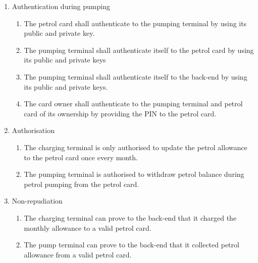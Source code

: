 \begin{enumerate}
\item Authentication during pumping
	\begin{enumerate}
	\item The petrol card shall authenticate to the pumping terminal by using its public and private key. %
	\item The pumping terminal shall authenticate itself to the petrol card by using its public and private keys
	\item The pumping terminal shall authenticate itself to the back-end by using its public and private keys.
	\item The card owner shall authenticate to the pumping terminal and petrol card of its ownership by providing the PIN to the petrol card.
	\end{enumerate}		

\item Authorisation
	\begin{enumerate}
	\item The charging terminal is only authorised to update the petrol allowance to the petrol card once every month.
	\item The pumping terminal is authorised to withdraw petrol balance during petrol pumping from the petrol card.
	\end{enumerate}


\item Non-repudiation
	\begin{enumerate}
		\item The charging terminal can prove to the back-end that it charged the monthly allowance to a valid petrol card. 
		\item The pump terminal can prove to the back-end that it collected petrol allowance from a valid petrol card.
	\end{enumerate}

\end{enumerate}
